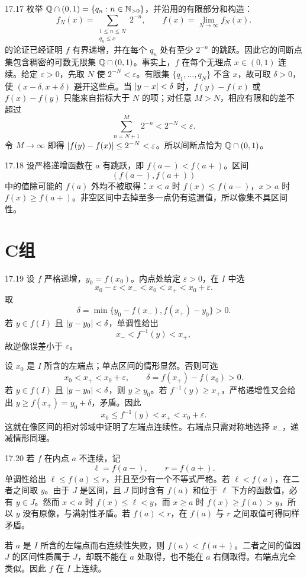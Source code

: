 \begin{solution}{17.17}
枚举 \(\mathbb{Q}\cap(0,1)=\{q_n:n\in\mathbb{N}_{>0}\}\)，并沿用的有限部分和构造：
\[
 f_N(x)=\sum_{\substack{1\le n\le N\\q_n\le x}}2^{-n},
 \qquad
 f(x)=\lim_{N\to\infty}f_N(x).
\]
的论证已经证明 \(f\) 有界递增，并在每个 \(q_n\) 处有至少 \(2^{-n}\) 的跳跃。因此它的间断点集包含稠密的可数无限集 \(\mathbb{Q}\cap(0,1)\)。事实上，\(f\) 在每个无理点 \(x\in(0,1)\) 连续。给定 \(\varepsilon>0\)，先取 \(N\) 使 \(2^{-N}<\varepsilon\)。有限集 \(\{q_1,\ldots,q_N\}\) 不含 \(x\)，故可取 \(\delta>0\)，使 \((x-\delta,x+\delta)\) 避开这些点。当 \(\left|y-x\right|<\delta\) 时，\(f(y)-f(x)\) 或 \(f(x)-f(y)\) 只能来自指标大于 \(N\) 的项；对任意 \(M>N\)，相应有限和的差不超过
\[
 \sum_{n=N+1}^{M}2^{-n}<2^{-N}<\varepsilon.
\]
令 \(M\to\infty\) 即得 \(\left|f(y)-f(x)\right|\le 2^{-N}<\varepsilon\)。所以间断点恰为 \(\mathbb{Q}\cap(0,1)\)。
\end{solution}

\begin{solution}{17.18}
设严格递增函数在 \(a\) 有跳跃，即 \(f(a-)<f(a+)\)。区间
\[
 (f(a-),f(a+))
\]
中的值除可能的 \(f(a)\) 外均不被取得：\(x<a\) 时 \(f(x)\le f(a-)\)，\(x>a\) 时 \(f(x)\ge f(a+)\)。非空区间中去掉至多一点仍有遗漏值，所以像集不具区间性。
\end{solution}

\section*{C组}

\begin{solution}{17.19}
设 \(f\) 严格递增，\(y_0=f(x_0)\)。内点处给定 \(\varepsilon>0\)，在 \(I\) 中选
\[
 x_0-\varepsilon<x_-<x_0<x_+<x_0+\varepsilon.
\]
取
\[
 \delta=\min\{y_0-f(x_-),f(x_+)-y_0\}>0.
\]
若 \(y\in f(I)\) 且 \(\left|y-y_0\right|<\delta\)，单调性给出
\[
 x_-<f^{-1}(y)<x_+,
\]
故逆像误差小于 \(\varepsilon\)。

设 \(x_0\) 是 \(I\) 所含的左端点；单点区间的情形显然。否则可选
\[
 x_0<x_+<x_0+\varepsilon,
 \qquad \delta=f(x_+)-f(x_0)>0.
\]
若 \(y\in f(I)\) 且 \(\left|y-y_0\right|<\delta\)，则 \(y\ge y_0\)。若 \(f^{-1}(y)\ge x_+\)，严格递增性又会给出 \(y\ge f(x_+)=y_0+\delta\)，矛盾。因此
\[
 x_0\le f^{-1}(y)<x_+<x_0+\varepsilon.
\]
这就在像区间的相对邻域中证明了左端点连续性。右端点只需对称地选择 \(x_-\)，递减情形同理。
\end{solution}

\begin{solution}{17.20}
若 \(f\) 在内点 \(a\) 不连续，记
\[
 \ell=f(a-),\qquad r=f(a+).
\]
单调性给出 \(\ell\le f(a)\le r\)，并且至少有一个不等式严格。若 \(\ell<f(a)\)，在二者之间取 \(y\)。由于 \(J\) 是区间，且 \(J\) 同时含有 \(f(a)\) 和位于 \(\ell\) 下方的函数值，必有 \(y\in J\)。然而 \(x<a\) 时 \(f(x)\le\ell<y\)，而 \(x\ge a\) 时 \(f(x)\ge f(a)>y\)，所以 \(y\) 没有原像，与满射性矛盾。若 \(f(a)<r\)，在 \(f(a)\) 与 \(r\) 之间取值可得同样矛盾。

若 \(a\) 是 \(I\) 所含的左端点而右连续性失败，则 \(f(a)<f(a+)\)。二者之间的值因 \(J\) 的区间性质属于 \(J\)，却既不能在 \(a\) 处取得，也不能在 \(a\) 右侧取得。右端点完全类似。因此 \(f\) 在 \(I\) 上连续。
\end{solution}

